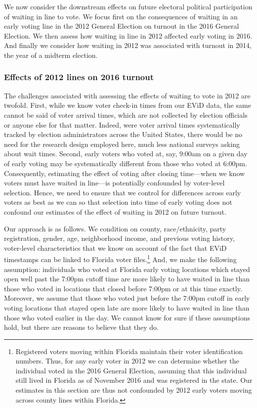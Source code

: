 \documentclass[12pt,titlepage]{article}
\begin{document}
We now consider the downstream effects on future electoral political
participation of waiting in line to vote. We focus first on the
consequences of waiting in an early voting line in the 2012 General
Election on turnout in the 2016 General Election. We then assess how
waiting in line in 2012 affected early voting in 2016. And finally we
consider how waiting in 2012 was associated with turnout in 2014, the
year of a midterm election.

\subsubsection*{Effects of 2012 lines on 2016 turnout}

The challenges associated with assessing the effects of waiting to
vote in 2012 are twofold.  First, while we know voter check-in times
from our EViD data, the same cannot be said of voter arrival times,
which are not collected by election officials or anyone else for that
matter.  Indeed, were voter arrival times systematically tracked by
election administrators across the United States, there would be no
need for the research design employed here, much less national surveys
asking about wait times.  Second, early voters who voted at, say,
9:00am on a given day of early voting may be systematically different
from those who voted at 6:00pm. Consequently, estimating the effect of
voting after closing time---when we know voters must have waited in
line---is potentially confounded by voter-level selection.  Hence, we
need to ensure that we control for differences across early voters as
best as we can so that selection into time of early voting does not
confound our estimates of the effect of waiting in 2012 on future
turnout.


Our approach is as follows. We condition on county, race/ethnicity,
party registration, gender, age, neighborhood income, and previous
voting history, voter-level characteristics that we know on account of
the fact that EViD timestamps can be linked to Florida voter
files.\footnote{Registered voters
  moving within Florida maintain their voter identification numbers.
  Thus, for any early voter in 2012 we can determine whether the
  individual voted in the 2016 General Election, assuming that this
  individual still lived in Florida as of November 2016 and was
  registered in the state. Our estimates in this section are thus not
  confounded by 2012 early voters moving across county lines within
  Florida.} And, we make the following assumption: individuals who
voted at Florida early voting locations which stayed open well past
the 7:00pm cutoff time are more likely to have waited in line than
those who voted in locations that closed before 7:00pm or at this time
exactly. Moreover, we assume that those who voted just before the
7:00pm cutoff in early voting locations that stayed open late are more
likely to have waited in line than those who voted earlier in the day.
We cannot know for sure if these assumptions hold, but there are
reasons to believe that they do.
\end{document}

